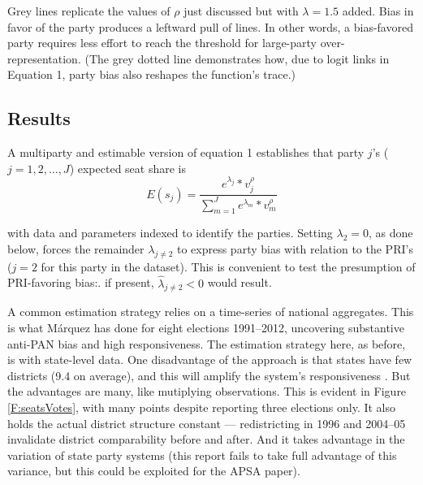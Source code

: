 \documentclass[letter,12pt]{article}
\begin{document}
Grey lines replicate the values of $\rho$ just discussed but with $\lambda = 1.5$ added. Bias in favor of the party produces a leftward pull of lines. In other words, a bias-favored party requires less effort to reach the threshold for large-party over-representation. (The grey dotted line demonstrates how, due to logit links in Equation 1, party bias also reshapes the function's trace.)

\subsection{Results}

A multiparty and estimable version of equation 1 \citep{king.1990elRespBiasMultiparty} establishes that party $j$'s ($j=1,2,\ldots,J$) expected seat share is 
\begin{equation}
 E(s_j) = \frac{e^{\lambda_j} * v_j^\rho}{\sum_{m=1}^{J} e^{\lambda_m} * v_m^\rho}
\end{equation}

\noindent with data and parameters indexed to identify the parties. \citep[Another, with application to Argentine federalism, is][.]{calvo.micozzi.govReform.2005} Setting $\lambda_2 = 0$, as done below, forces the remainder $\lambda_{j \neq 2}$ to express party bias with relation to the PRI's ($j=2$ for this party in the dataset). This is convenient to test the presumption of PRI-favoring bias:. if present, $\hat{\lambda}_{j \neq 2}<0$ would result.

A common estimation strategy relies on a time-series of national aggregates. This is what M\'arquez has done for eight elections 1991--2012, uncovering substantive anti-PAN bias and high responsiveness. The estimation strategy here, as before, is with state-level data. One disadvantage of the approach is that states have few districts (9.4 on average), and this will amplify the system's responsiveness \citep{taagepera.CubeLaw.1973}. But the advantages are many, like mutiplying observations. This is evident in Figure \ref{F:seatsVotes}, with many points despite reporting three elections only. It also holds the actual district structure constant --- redistricting in 1996 and 2004--05 invalidate district comparability before and after. And it takes advantage in the variation of state party systems (this report fails to take full advantage of this variance, but this could be exploited for the APSA paper). 
\end{document}
